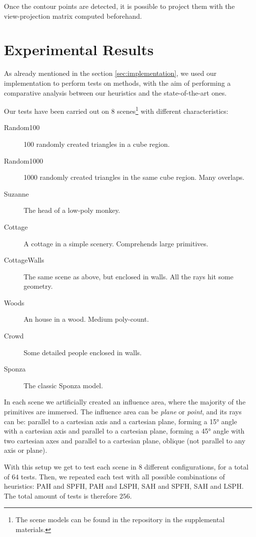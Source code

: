 \documentclass[acmtog, anonymous, review]{acmart}
\begin{document}
Once the contour points are detected, it is possible to project them with the view-projection matrix computed beforehand.

\section{Experimental Results} \label{sec:exp_results}
As already mentioned in the section \ref{sec:implementation}, we used our implementation to perform tests on methods, with the aim of performing a comparative analysis between our heuristics and the state-of-the-art ones.

Our tests have been carried out on 8 scenes\footnote{The scene models can be found in the repository in the supplemental materials.} with different characteristics:
\begin{description}
  \item[Random100] 100 randomly created triangles in a cube region.
  \item[Random1000] 1000 randomly created triangles in the same cube region. Many overlaps.
  \item[Suzanne] The head of a low-poly monkey.
  \item[Cottage] A cottage in a simple scenery. Comprehends large primitives. 
  \item[CottageWalls] The same scene as above, but enclosed in walls. All the rays hit some geometry.
  \item[Woods] An house in a wood. Medium poly-count.
  \item[Crowd] Some detailed people enclosed in walls.
  \item[Sponza] The classic Sponza model.    
\end{description}

In each scene we artificially created an influence area, where the majority of the primitives are immersed. The influence area can be \textit{plane} or \textit{point}, and its rays can be: parallel to a cartesian axis and a cartesian plane, forming a 15° angle with a cartesian axis and parallel to a cartesian plane, forming a 45° angle with two cartesian axes and parallel to a cartesian plane, oblique (not parallel to any axis or plane).

With this setup we get to test each scene in $8$ different configurations, for a total of $64$ tests. Then, we repeated each test with all possible combinations of heuristics: PAH and SPFH, PAH and LSPH, SAH and SPFH, SAH and LSPH. The total amount of tests is therefore $256$.
\end{document}
